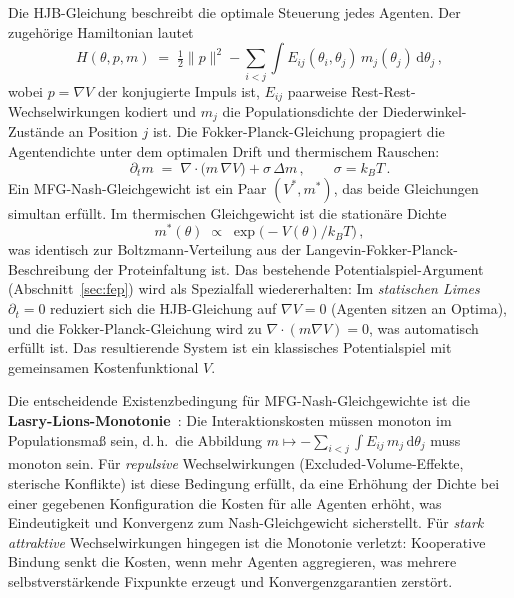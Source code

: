 \documentclass[12pt,a4paper]{article}
\theoremstyle{remark}
\begin{document}
Die HJB-Gleichung beschreibt die optimale Steuerung jedes Agenten. Der zugeh\"orige Hamiltonian lautet
\begin{equation}\label{eq:mfg-hamiltonian}
  H(\theta,p,m) \;=\; \tfrac{1}{2}\|p\|^{2}
    - \sum_{i<j}\int E_{ij}(\theta_i,\theta_j)\,m_j(\theta_j)\,\mathrm{d}\theta_j\,,
\end{equation}
wobei $p=\nabla V$ der konjugierte Impuls ist, $E_{ij}$ paarweise Rest-Rest-Wechselwirkungen kodiert und $m_j$ die Populationsdichte der Diederwinkel-Zust\"ande an Position $j$ ist. Die Fokker-Planck-Gleichung propagiert die Agentendichte unter dem optimalen Drift und thermischem Rauschen:
\begin{equation}\label{eq:mfg-fp}
  \partial_t m \;=\; \nabla\!\cdot\!\bigl(m\,\nabla V\bigr) + \sigma\,\Delta m\,,
  \qquad \sigma = k_B T\,.
\end{equation}
Ein MFG-Nash-Gleichgewicht ist ein Paar $(V^{*},m^{*})$, das beide Gleichungen simultan erf\"ullt. Im thermischen Gleichgewicht ist die station\"are Dichte
\begin{equation}\label{eq:mfg-boltzmann}
  m^{*}(\theta) \;\propto\; \exp\!\bigl(-V(\theta)/k_B T\bigr)\,,
\end{equation}
was identisch zur Boltzmann-Verteilung aus der Langevin-Fokker-Planck-Beschreibung der Proteinfaltung ist. Das bestehende Potentialspiel-Argument (Abschnitt~\ref{sec:fep}) wird als Spezialfall wiedererhalten: Im \emph{statischen Limes} $\partial_t=0$ reduziert sich die HJB-Gleichung auf $\nabla V=0$ (Agenten sitzen an Optima), und die Fokker-Planck-Gleichung wird zu $\nabla\!\cdot(m\nabla V)=0$, was automatisch erf\"ullt ist. Das resultierende System ist ein klassisches Potentialspiel mit gemeinsamen Kostenfunktional $V$.

Die entscheidende Existenzbedingung f\"ur MFG-Nash-Gleichgewichte ist die \textbf{Lasry-Lions-Monotonie}~\cite{LasryLions2007}: Die Interaktionskosten m\"ussen monoton im Populationsma\ss{} sein, d.\,h.\ die Abbildung $m\mapsto -\sum_{i<j}\int E_{ij}\,m_j\,\mathrm{d}\theta_j$ muss monoton sein. F\"ur \emph{repulsive} Wechselwirkungen (Excluded-Volume-Effekte, sterische Konflikte) ist diese Bedingung erf\"ullt, da eine Erh\"ohung der Dichte bei einer gegebenen Konfiguration die Kosten f\"ur alle Agenten erh\"oht, was Eindeutigkeit und Konvergenz zum Nash-Gleichgewicht sicherstellt. F\"ur \emph{stark attraktive} Wechselwirkungen hingegen ist die Monotonie verletzt: Kooperative Bindung senkt die Kosten, wenn mehr Agenten aggregieren, was mehrere selbstverst\"arkende Fixpunkte erzeugt und Konvergenzgarantien zerst\"ort.
\end{document}
